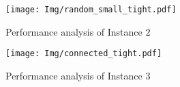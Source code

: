 \begin{figure}[!ht]
    \centering
    \texttt{[image: Img/random\_small\_tight.pdf]}
    \caption{Performance analysis of Instance $2$}
    \label{fig:small-random}
\end{figure}

\begin{figure}[!ht]
    \centering
    \texttt{[image: Img/connected\_tight.pdf]}
    \caption{Performance analysis of Instance $3$}
    \label{fig:connected}
\end{figure}
